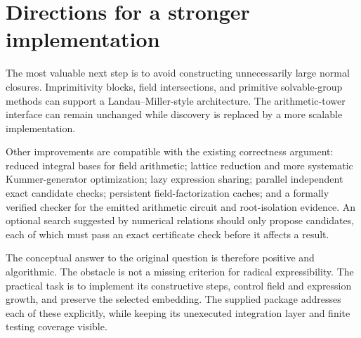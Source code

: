 \documentclass[11pt,a4paper]{article}
\theoremstyle{definition}\newtheorem{definition}[theorem]{Definition}
\theoremstyle{remark}\newtheorem{remark}[theorem]{Remark}
\begin{document}
\section{Directions for a stronger implementation}
The most valuable next step is to avoid constructing unnecessarily large
normal closures. Imprimitivity blocks, field intersections, and primitive
solvable-group methods can support a Landau--Miller-style architecture.
The arithmetic-tower interface can remain unchanged while discovery is
replaced by a more scalable implementation.

Other improvements are compatible with the existing correctness argument:
reduced integral bases for field arithmetic; lattice reduction and more
systematic Kummer-generator optimization; lazy expression sharing;
parallel independent exact candidate checks; persistent field-factorization
caches; and a formally verified checker for the emitted arithmetic circuit
and root-isolation evidence. An optional search suggested by numerical
relations should only propose candidates, each of which must pass an exact
certificate check before it affects a result.

The conceptual answer to the original question is therefore positive and
algorithmic. The obstacle is not a missing criterion for radical
expressibility. The practical task is to implement its constructive steps,
control field and expression growth, and preserve the selected embedding.
The supplied package addresses each of these explicitly, while keeping its
unexecuted integration layer and finite testing coverage visible.
\end{document}
